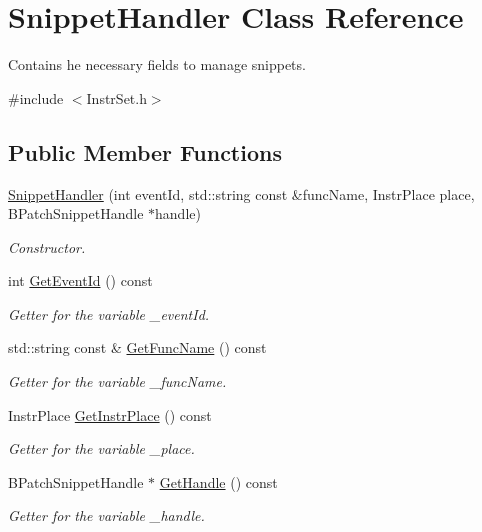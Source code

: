 \hypertarget{class_snippet_handler}{\section{Snippet\-Handler Class Reference}
\label{class_snippet_handler}
}


Contains he necessary fields to manage snippets.  




{\ttfamily \#include $<$Instr\-Set.\-h$>$}

\subsection*{Public Member Functions}
\begin{DoxyCompactItemize}
\item 
\hyperlink{class_snippet_handler_a9e730838c6bb4f666fe8e698c76c214b}{Snippet\-Handler} (int event\-Id, std\-::string const \&func\-Name, Instr\-Place place, B\-Patch\-Snippet\-Handle $\ast$handle)
\begin{DoxyCompactList}\small\item\em Constructor. \end{DoxyCompactList}\item 
int \hyperlink{class_snippet_handler_aeae6b14804f87bd05083a12e99083231}{Get\-Event\-Id} () const 
\begin{DoxyCompactList}\small\item\em Getter for the variable \-\_\-event\-Id. \end{DoxyCompactList}\item 
std\-::string const \& \hyperlink{class_snippet_handler_add5366fea9da46b6b2a014dbd876ce0f}{Get\-Func\-Name} () const 
\begin{DoxyCompactList}\small\item\em Getter for the variable \-\_\-func\-Name. \end{DoxyCompactList}\item 
Instr\-Place \hyperlink{class_snippet_handler_aed03dbc332b0038541c95519ab6438a9}{Get\-Instr\-Place} () const 
\begin{DoxyCompactList}\small\item\em Getter for the variable \-\_\-place. \end{DoxyCompactList}\item 
B\-Patch\-Snippet\-Handle $\ast$ \hyperlink{class_snippet_handler_a093f1944ea0878911ffea7b471ccc45e}{Get\-Handle} () const 
\begin{DoxyCompactList}\small\item\em Getter for the variable \-\_\-handle. \end{DoxyCompactList}\end{DoxyCompactItemize}


